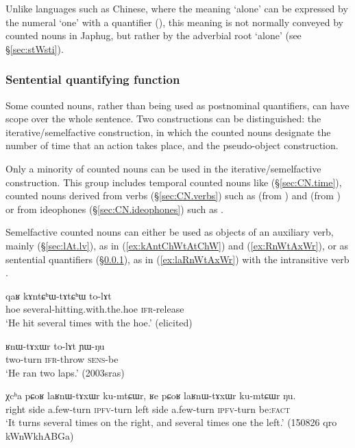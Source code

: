 Unlike languages such as Chinese, where the meaning  `alone' can be expressed by the numeral `one' with a quantifier (), this meaning is not normally conveyed by counted nouns in Japhug, but rather by the adverbial root  `alone' (see §\ref{sec:stWsti}).

\subsubsection{Sentential quantifying function } \label{sec:CN.iterative}
Some counted nouns, rather than being used as postnominal quantifiers, can have scope over the whole sentence. Two constructions can be distinguished: the iterative/semelfactive construction, in which the counted nouns designate the number of time that an action takes place, and the pseudo-object construction.

Only a minority of counted nouns can be used in the iterative/semelfactive construction. This group includes temporal counted nouns like  (§\ref{sec:CN.time}),  counted nouns derived from verbs (§\ref{sec:CN.verbs})  such as  (from ) and  (from ) or from ideophones  (§\ref{sec:CN.ideophones}) such as .

Semelfactive counted nouns can either be used as objects of an auxiliary verb, mainly  (§\ref{sec:lAt.lv}), as in (\ref{ex:kAntChWtAtChW}) and (\ref{ex:RnWtAxWr}), or as sentential quantifiers (§\ref{sec:CN.iterative}), as in (\ref{ex:laRnWtAxWr}) with the intransitive verb .

\begin{exe}
	\ex \label{ex:kAntChWtAtChW}
	\gll qaʁ kɤntɕʰɯ-tɤtɕʰɯ to-lɤt \\
	hoe several-hitting.with.the.hoe \textsc{ifr}-release \\
	\glt `He hit several times with the hoe.' (elicited)
\end{exe}

\begin{exe}
	\ex \label{ex:RnWtAxWr}
	\gll ʁnɯ-tɤxɯr to-lɤt ɲɯ-ŋu \\
	two-turn \textsc{ifr}-throw \textsc{sens}-be \\
	\glt `He ran two laps.' (2003sras)
\end{exe}

\begin{exe}
	\ex \label{ex:laRnWtAxWr}
	\gll χcʰa pɕoʁ laʁnɯ-tɤxɯr ku-mtɕɯr, ʁe pɕoʁ laʁnɯ-tɤxɯr ku-mtɕɯr ŋu. \\
	right side a.few-turn \textsc{ipfv}-turn left side a.few-turn \textsc{ipfv}-turn be:\textsc{fact} \\
	\glt `It turns several times on the right, and several times one the left.' (150826 qro kWnWkhABGa)
\end{exe}



